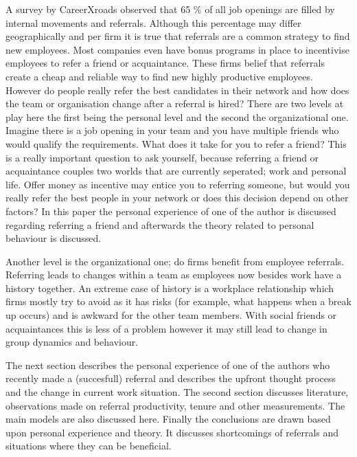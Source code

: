 \documentclass[a4paper, 11pt]{article} %
\begin{document}
A survey by CareerXroads \cite{referralpercentage} observed that 65 \% of all job openings are filled by internal movements and referrals. Although this percentage may differ geographically and per firm it is true that referrals are a common strategy to find new employees. Most companies even have bonus programs in place to  incentivise employees to refer a friend or acquaintance. These firms belief that referrals create a cheap \cite{fourth} and reliable way to find new highly productive employees. However do people really refer the best candidates in their network and how does the team or organisation change after a referral is hired? There are two levels at play here the first being the personal level and the second the organizational one. \\

Imagine there is a job opening in your team and you have multiple friends who would qualify the requirements. What does it take for you to refer a friend? This is a really important question to ask yourself, because referring a friend or acquaintance couples two worlds that are currently seperated; work and personal life. Offer money as incentive may entice you to referring someone, but would you really refer the best people in your network or does this decision depend on other factors? In this paper the personal experience of one of the author is discussed regarding referring a friend and afterwards the theory related to personal behaviour is discussed.

Another level is the organizational one; do firms benefit from employee referrals. Referring leads to changes within a team as employees now besides work have a history together. An extreme case of history is a workplace relationship which firms mostly try to avoid as it has risks (for example, what happens when a break up occurs) and is awkward for the other team members. With social friends or acquaintances this is less of a problem however it may still lead to change in group dynamics and behaviour.  

The next section describes the personal experience of one of the authors who recently made a (succesfull) referral and describes the upfront thought process and the change in current work situation. The second section discusses literature, observations made on referral productivity, tenure and other measurements. The main models are also discussed here. Finally the conclusions are drawn based upon personal experience and theory. It discusses shortcomings of referrals and situations where they can be beneficial.
\end{document}
